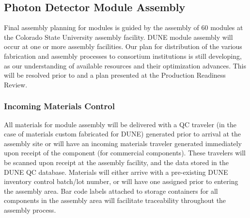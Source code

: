 \label{sec:fdsp-pd-prod-pc}








\subsection{Photon Detector Module Assembly}

Final assembly planning for  modules is guided by the assembly of \num{60}   modules at the Colorado State University assembly facility. DUNE   module assembly will occur at one or more assembly facilities.  Our plan for distribution of the various fabrication and assembly processes to consortium institutions is still developing, as our understanding of available resources and their optimization advances.  This will be resolved prior to and a plan presented at the Production Readiness Review.

\subsubsection{Incoming Materials Control}

All materials for  module assembly will be delivered with a QC traveler (in the case of materials custom fabricated for DUNE) generated prior to arrival at the assembly site or will have an incoming materials traveler generated immediately upon receipt of the component (for commercial components).  These travelers will be scanned upon receipt at the assembly facility, and the data stored in the DUNE QC database.  Materials will either arrive with a pre-existing DUNE inventory control batch/lot number, or will have one assigned prior to entering the assembly area.  Bar code labels attached to storage containers for all components in the assembly area will facilitate traceability throughout the assembly process.

